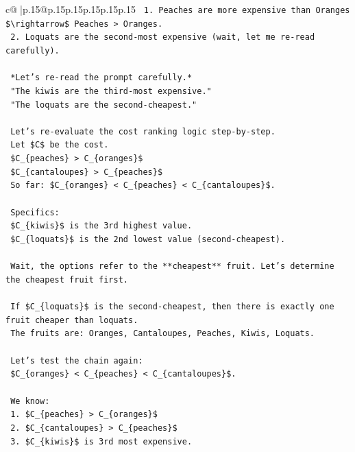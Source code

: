 \documentclass{article}
\begin{document}
{\begin{supertabular}{c@{$\;$}|p{.15\linewidth}@{}p{.15\linewidth}p{.15\linewidth}p{.15\linewidth}p{.15\linewidth}p{.15\linewidth}}
{{{\texttt{        1.  Peaches are more expensive than Oranges \$\textbackslash{}rightarrow\$ Peaches > Oranges.} \\
\texttt{        2.  Loquats are the second{-}most expensive (wait, let me re{-}read carefully).} \\
\\ 
\texttt{    *Let's re{-}read the prompt carefully.*} \\
\texttt{    "The kiwis are the third{-}most expensive."} \\
\texttt{    "The loquats are the second{-}cheapest."} \\
\\ 
\texttt{    Let's re{-}evaluate the cost ranking logic step{-}by{-}step.} \\
\texttt{    Let \$C\$ be the cost.} \\
\texttt{    \$C\_\{peaches\} > C\_\{oranges\}\$} \\
\texttt{    \$C\_\{cantaloupes\} > C\_\{peaches\}\$} \\
\texttt{    So far: \$C\_\{oranges\} < C\_\{peaches\} < C\_\{cantaloupes\}\$.} \\
\\ 
\texttt{    Specifics:} \\
\texttt{    \$C\_\{kiwis\}\$ is the 3rd highest value.} \\
\texttt{    \$C\_\{loquats\}\$ is the 2nd lowest value (second{-}cheapest).} \\
\\ 
\texttt{    Wait, the options refer to the **cheapest** fruit. Let's determine the cheapest fruit first.} \\
\\ 
\texttt{    If \$C\_\{loquats\}\$ is the second{-}cheapest, then there is exactly one fruit cheaper than loquats.} \\
\texttt{    The fruits are: Oranges, Cantaloupes, Peaches, Kiwis, Loquats.} \\
\\ 
\texttt{    Let's test the chain again:} \\
\texttt{    \$C\_\{oranges\} < C\_\{peaches\} < C\_\{cantaloupes\}\$.} \\
\\ 
\texttt{    We know:} \\
\texttt{    1.  \$C\_\{peaches\} > C\_\{oranges\}\$} \\
\texttt{    2.  \$C\_\{cantaloupes\} > C\_\{peaches\}\$} \\
\texttt{    3.  \$C\_\{kiwis\}\$ is 3rd most expensive.} \\
}}}
\end{supertabular}}
\end{document}
